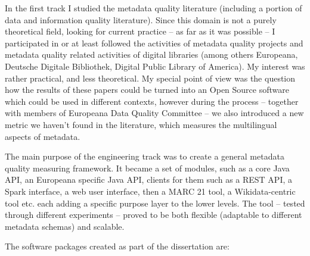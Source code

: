 In the first track I studied the metadata quality literature (including a portion of data and information quality literature). Since this domain is not a purely theoretical field, looking for current practice -- as far as it was possible -- I participated in or at least followed the activities of metadata quality projects and metadata quality related activities of digital libraries (among others Europeana, Deutsche Digitale Bibliothek, Digital Public Library of America). My interest was rather practical, and less theoretical. My special point of view was the question how the results of these papers could be turned into an Open Source software which could be used in different contexts, however during the process -- together with members of Europeana Data Quality Committee -- we also introduced a new metric we haven't found in the literature, which measures the multilingual aspects of metadata.

The main purpose of the engineering track was to create a general metadata quality measuring framework. It became a set of modules, such as a core Java API, an Europeana specific Java API, clients for them such as a REST API, a Spark interface, a web user interface, then a MARC 21 tool, a Wikidata-centric tool etc. each adding a specific purpose layer to the lower levels. The tool -- tested through different experiments -- proved to be both flexible (adaptable to different metadata schemas) and scalable.

The software packages created as part of the dissertation are:


